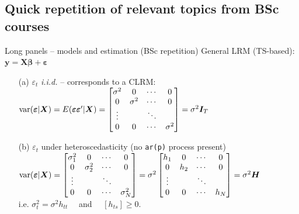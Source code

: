 \documentclass[usenames,dvipsnames]{beamer}
\begin{document}
\subsection*{Quick repetition of relevant topics from BSc courses}
\begin{frame}{Long panels -- models and estimation (BSc repetition)}
\footnotesize
General LRM (TS-based): $\bm{y} = \bm{X\beta}+\bm{\varepsilon}$\\ \medskip
\begin{itemize}
    \item[(a)] $\varepsilon_t$ \textit{i.i.d.} -- corresponds to a CLRM: \\ \medskip $\textnormal{var}(\bm{\varepsilon}|\bm{X}) = E(\bm{\varepsilon \varepsilon}^{\prime}|\bm{X})= 
    \begin{bmatrix}
    \sigma^2 		& 	0 	& 	\cdots	& 	0 \\
        0 	        & 	\sigma^2 		& \cdots 	&  0				\\
     	\vdots	& 		& 	\ddots	& 	 		\\
    0 &		0	&	\cdots &		\sigma^2
\end{bmatrix} = 
    \sigma^2\bm{I}_T$ 
    \bigskip
    \item[(b)] $\varepsilon_t$ under heteroscedasticity (no \texttt{ar(p)} process present)\\ \medskip
    $\textnormal{var}(\bm{\varepsilon}|\bm{X}) = 
    \begin{bmatrix}
    \sigma^2_1 		& 	0 	& 	\cdots	& 	0 \\
        0 	        & 	\sigma^2_2 		& \cdots 	&  0				\\
     	\vdots	& 		& 	\ddots	& 	 		\\
    0 &		0	&	\cdots &		\sigma^2_N
\end{bmatrix} = 
\sigma^2 
\begin{bmatrix}
    h_1 		& 	0 	& 	\cdots	& 	0 \\
        0 	        & 	h_2 		& \cdots 	&  0				\\
     	\vdots	& 		& 	\ddots	& 	 		\\
    0 &		0	&	\cdots &		h_N
\end{bmatrix} = \sigma^2 \bm{H}$\\ \medskip i.e. $\sigma^2_t = \sigma^2 h_{tt}$ ~~and~~ $[h_{ts}]\geq 0$.
\end{itemize}
\end{frame}
\end{document}
